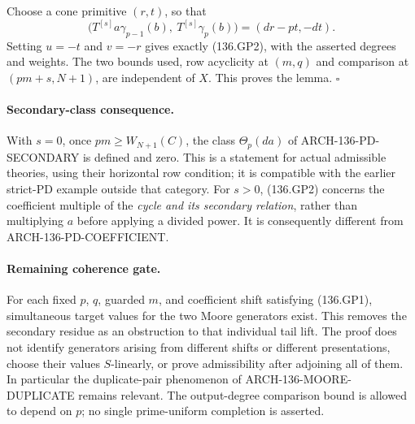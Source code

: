 Choose a cone primitive \((r,t)\), so that
\[
 \bigl(T^{[s]}a\gamma_{p-1}(b),\
       T^{[s]}\gamma_p(b)\bigr)
              =(dr-pt,-dt).
 \tag{136.GP7}
\]
Setting \(u=-t\) and \(v=-r\) gives exactly (136.GP2), with the
asserted degrees and weights. The two bounds used, row acyclicity
at \((m,q)\) and comparison at \((pm+s,N+1)\), are independent
of \(X\). This proves the lemma. \(\square\)

\paragraph{Secondary-class consequence.}
With \(s=0\), once \(pm\geq W_{N+1}(C)\), the class
\(\Theta_p(da)\) of ARCH-136-PD-SECONDARY is defined and zero.
This is a statement for actual admissible theories, using their
horizontal row condition; it is compatible with the earlier
strict-PD example outside that category. For \(s>0\), (136.GP2)
concerns the coefficient multiple of the \emph{cycle and its
secondary relation}, rather than multiplying \(a\) before
applying a divided power. It is consequently different from
ARCH-136-PD-COEFFICIENT.

\paragraph{Remaining coherence gate.}
For each fixed \(p\), \(q\), guarded \(m\), and coefficient shift
satisfying (136.GP1), simultaneous target values for the two Moore
generators exist. This removes the secondary residue as an
obstruction to that individual tail lift. The proof does not
identify generators arising from different shifts or different
presentations, choose their values \(S\)-linearly, or prove
admissibility after adjoining all of them. In particular the
duplicate-pair phenomenon of ARCH-136-MOORE-DUPLICATE remains
relevant. The output-degree comparison bound is allowed to depend
on \(p\); no single prime-uniform completion is asserted.

